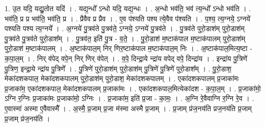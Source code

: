 \documentclass[17pt]{extarticle}
\begin{document}
1. उ॒त यदि॒ यद्यु॒तोत यदि॑ । . यद्य॒न्धो᳚ ऽन्धो यदि॒ यद्य॒न्धः । . अ॒न्धो भव॑ति॒ भव॑ त्य॒न्धो᳚ ऽन्धो भव॑ति । . भव॑ति॒ प्र प्र भव॑ति॒ भव॑ति॒ प्र । . प्रैवैव प्र प्रैव । . ए॒व प॑श्यति पश्य त्ये॒वैव प॑श्यति । . प॒श्य॒ त्य॒ग्नये॒ ऽग्नये॑ पश्यति पश्य त्य॒ग्नये᳚ । . अ॒ग्नये॑ पु॒त्रव॑ते पु॒त्रव॑ते॒ ऽग्नये॒ ऽग्नये॑ पु॒त्रव॑ते । . पु॒त्रव॑ते पुरो॒डाश॑म् पुरो॒डाश॑म् पु॒त्रव॑ते पु॒त्रव॑ते पुरो॒डाश᳚म् । . पु॒त्रव॑त॒ इति॑ पु॒त्र - व॒ते॒ । . पु॒रो॒डाश॑ म॒ष्टाक॑पाल म॒ष्टाक॑पालम् पुरो॒डाश॑म् पुरो॒डाश॑ म॒ष्टाक॑पालम् । . अ॒ष्टाक॑पाल॒म् निर् णिर॒ष्टाक॑पाल म॒ष्टाक॑पाल॒म् निः । . अ॒ष्टाक॑पाल॒मित्य॒ष्टा - क॒पा॒ल॒म् । . निर् व॑पेद् वपे॒न् निर् णिर् व॑पेत् । . व॒पे॒ दिन्द्रा॒ये न्द्रा॑य वपेद् वपे॒ दिन्द्रा॑य । . इन्द्रा॑य पु॒त्रिणे॑ पु॒त्रिण॒ इन्द्रा॒ये न्द्रा॑य पु॒त्रिणे᳚ । . पु॒त्रिणे॑ पुरो॒डाश॑म् पुरो॒डाश॑म् पु॒त्रिणे॑ पु॒त्रिणे॑ पुरो॒डाश᳚म् । . पु॒रो॒डाश॒ मेका॑दशकपाल॒ मेका॑दशकपालम् पुरो॒डाश॑म् पुरो॒डाश॒ मेका॑दशकपालम् । . एका॑दशकपालम् प्र॒जाका॑मः प्र॒जाका॑म॒ एका॑दशकपाल॒ मेका॑दशकपालम् प्र॒जाका॑मः । . एका॑दशकपाल॒मित्येका॑दश - क॒पा॒ल॒म् । . प्र॒जाका॑मो॒ ऽग्नि र॒ग्निः प्र॒जाका॑मः प्र॒जाका॑मो॒ ऽग्निः । . प्र॒जाका॑म॒ इति॑ प्र॒जा - का॒मः॒ । . अ॒ग्नि रे॒वैवाग्नि र॒ग्नि रे॒व । . ए॒वास्मा॑ अस्मा ए॒वैवास्मै᳚ । . अ॒स्मै॒ प्र॒जाम् प्र॒जा म॑स्मा अस्मै प्र॒जाम् । . प्र॒जाम् प्र॑ज॒नय॑ति प्रज॒नय॑ति प्र॒जाम् प्र॒जाम् प्र॑ज॒नय॑ति । \newline
\end{document}
